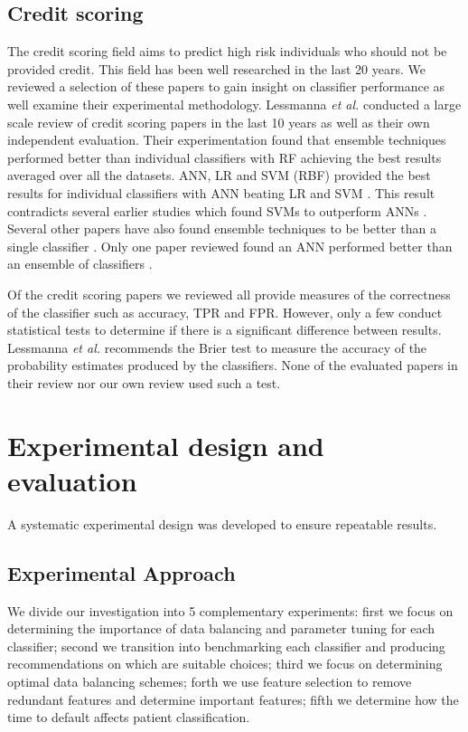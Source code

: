 \documentclass{sig-alternate-05-2015}
\begin{document}
	\subsection{Credit scoring}
	\label{credit-scoring-review}
	The credit scoring field aims to predict high risk individuals who should not be provided credit. This field has been well researched in the last 20 years. We reviewed a selection of these papers to gain insight on classifier performance as well examine their experimental methodology. Lessmanna \textit{et al.} \cite{lessmanna2013benchmarking} conducted a large scale review of credit scoring papers in the last 10 years as well as their own independent evaluation. Their experimentation found that ensemble techniques performed better than individual classifiers with RF achieving the best results averaged over all the datasets. ANN, LR and SVM (RBF) provided the best results for individual classifiers with ANN beating LR and SVM \cite{lessmanna2013benchmarking}. This result contradicts several earlier studies which found SVMs to outperform ANNs \cite{Danenas20153194, Huang2007847, Huang2004543, Li2006772}. Several other papers have also found ensemble techniques to be better than a single classifier \cite{Hsieh2010534, Nanni20093028, Twala20103326, Wang2011223}. Only one paper reviewed found an ANN performed better than an ensemble of classifiers \cite{Tsai20082639}.
	
	Of the credit scoring papers we reviewed \cite{Abdou2016, Angelini2008733, Bekhet201420, Danenas20153194, Desai199624, Hsieh2010534, Huang2004543, Huang2007847, Lee2002245, Li2006772, Luo20097562, Malhotra200383, Nanni20093028, Tsai20082639, Twala20103326, Wang2011223} all provide measures of the correctness of the classifier such as accuracy, TPR and FPR. However, only a few \cite{Desai199624, Huang2004543, Malhotra200383, Wang2011223} conduct statistical tests to determine if there is a significant difference between results. Lessmanna \textit{et al.} \cite{lessmanna2013benchmarking} recommends the Brier test to measure the accuracy of the probability estimates produced by the classifiers. None of the evaluated papers in their review nor our own review used such a test.
	
	\section{Experimental design and evaluation}
	A systematic experimental design was developed to ensure repeatable results.
	\subsection{Experimental Approach}
	\label{method-approach}
	We divide our investigation into 5 complementary experiments: first we focus on determining the importance of data balancing and parameter tuning for each classifier; second we transition into benchmarking each classifier and producing recommendations on which are suitable choices; third  we focus on determining optimal data balancing schemes; forth we use feature selection to remove redundant features and determine important features; fifth we determine how the time to default affects patient classification.
	
\end{document}
